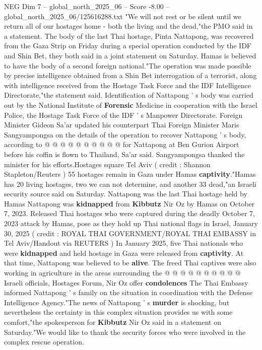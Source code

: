\begin{textsample}{NEG Dim 7 – global\_north\_2025\_06 – Score -8.00 – global\_north\_2025\_06/125616288.txt}  \label{ex:f7_neg_077}
"We will not rest or be silent until we return all of our hostages home - both the living and the dead,"the PMO said in a statement.
The body of the last Thai hostage, Pinta Nattapong, was recovered from the Gaza Strip on Friday during a special operation conducted by the IDF and Shin Bet, they both said in a joint statement on Saturday.
Hamas is believed to have the body of a second foreign national."The operation was made possible by precise intelligence obtained from a Shin Bet interrogation of a terrorist, along with intelligence received from the Hostage Task Force and the IDF Intelligence Directorate,"the statement said.
Identification of Nattapong ' s body was carried out by the National Institute of \textbf{Forensic} Medicine in cooperation with the Israel Police, the Hostage Task Force of the IDF ' s Manpower Directorate.
Foreign Minister Gideon Sa'ar updated his counterpart Thai Foreign Minister Maris Sangyampongsa on the details of the operation to recover Nattapong ' s body, according to @ @ @ @ @ @ @ @ @ @ for Nattapong at Ben Gurion Airport before his coffin is flown to Thailand, Sa'ar said.
Sangyampongsa thanked the minister for his efforts.Hostages square Tel Aviv ( credit : Shannon Stapleton/Reuters ) 55 hostages remain in Gaza under Hamas \textbf{captivity}."Hamas has 20 living hostages, two we can not determine, and another 33 dead,"an Israeli security source said on Saturday.
Nattapong was the last Thai hostage held by Hamas Nattapong was \textbf{kidnapped} from \textbf{Kibbutz} Nir Oz by Hamas on October 7, 2023.
Released Thai hostages who were captured during the deadly October 7, 2023 attack by Hamas, pose as they hold up Thai national flags in Israel, January 30, 2025 ( credit : ROYAL THAI GOVERNMENT/ROYAL THAI EMBASSY in Tel Aviv/Handout via REUTERS ) In January 2025, five Thai nationals who were \textbf{kidnapped} and held hostage in Gaza were released from \textbf{captivity}.
At that time, Nattapong was believed to be \textbf{alive}.
The freed Thai captives were also working in agriculture in the areas surrounding the @ @ @ @ @ @ @ @ @ @ Israeli officials, Hostages Forum, Nir Oz offer \textbf{condolences} The Thai Embassy informed Nattapong ' s family on the situation in coordination with the Defense Intelligence Agency."The news of Nattapong ' s \textbf{murder} is shocking, but nevertheless the certainty in this complex situation provides us with some comfort,"the spokesperson for \textbf{Kibbutz} Nir Oz said in a statement on Saturday."We would like to thank the security forces who were involved in the complex rescue operation.

\end{textsample}

